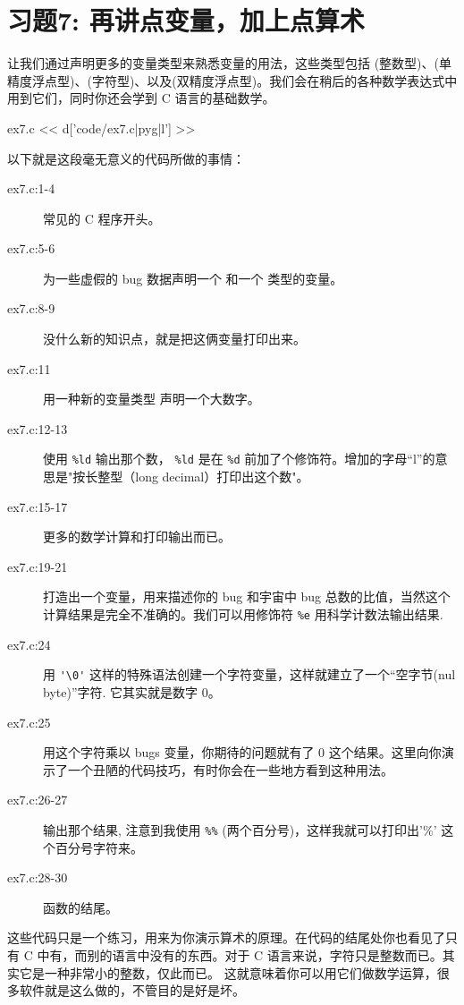 \chapter{习题7: 再讲点变量，加上点算术}

让我们通过声明更多的变量类型来熟悉变量的用法，这些类型包括 (整数型)、(单精度浮点型)、(字符型)、以及(双精度浮点型)。我们会在稍后的各种数学表达式中用到它们，同时你还会学到 C 语言的基础数学。

\begin{code}{ex7.c}
<< d['code/ex7.c|pyg|l'] >>
\end{code}

以下就是这段毫无意义的代码所做的事情：

\begin{description}
\item[ex7.c:1-4] 常见的 C 程序开头。
\item[ex7.c:5-6] 为一些虚假的 bug 数据声明一个  和一个  类型的变量。
\item[ex7.c:8-9] 没什么新的知识点，就是把这俩变量打印出来。
\item[ex7.c:11] 用一种新的变量类型  声明一个大数字。
\item[ex7.c:12-13] 使用 \verb|%ld| 输出那个数， \verb|%ld| 是在 \verb|%d| 前加了个修饰符。增加的字母“l”的意思是"按长整型（long decimal）打印出这个数"。
\item[ex7.c:15-17] 更多的数学计算和打印输出而已。
\item[ex7.c:19-21] 打造出一个变量，用来描述你的 bug 和宇宙中 bug 总数的比值，当然这个计算结果是完全不准确的。我们可以用修饰符 \verb|%e|  用科学计数法输出结果.
\item[ex7.c:24] 用 \verb|'\0'| 这样的特殊语法创建一个字符变量，这样就建立了一个“空字节(nul byte)”字符.  它其实就是数字 0。
\item[ex7.c:25] 用这个字符乘以 bugs 变量，你期待的问题就有了 0 这个结果。这里向你演示了一个丑陋的代码技巧，有时你会在一些地方看到这种用法。
\item[ex7.c:26-27] 输出那个结果, 注意到我使用 \verb|%%| (两个百分号)，这样我就可以打印出'\%' 这个百分号字符来。
\item[ex7.c:28-30]  函数的结尾。
\end{description}

这些代码只是一个练习，用来为你演示算术的原理。在代码的结尾处你也看见了只有 C 中有，而别的语言中没有的东西。对于 C 语言来说，字符只是整数而已。其实它是一种非常小的整数，仅此而已。 这就意味着你可以用它们做数学运算，很多软件就是这么做的，不管目的是好是坏。

